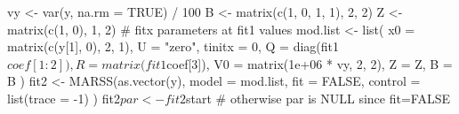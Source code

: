 \begin{Schunk}
\begin{Sinput}
 vy <- var(y, na.rm = TRUE) / 100
 B <- matrix(c(1, 0, 1, 1), 2, 2)
 Z <- matrix(c(1, 0), 1, 2)
 # fitx parameters at fit1 values
 mod.list <- list(
   x0 = matrix(c(y[1], 0), 2, 1), U = "zero", tinitx = 0,
   Q = diag(fit1$coef[1:2]), R = matrix(fit1$coef[3]),
   V0 = matrix(1e+06 * vy, 2, 2), Z = Z, B = B
 )
 fit2 <- MARSS(as.vector(y),
   model = mod.list, fit = FALSE,
   control = list(trace = -1)
 )
 fit2$par <- fit2$start # otherwise par is NULL since fit=FALSE
\end{Sinput}
\end{Schunk}
